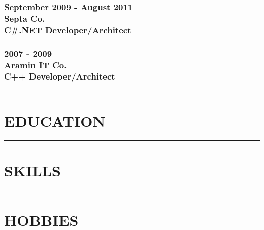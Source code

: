 \documentclass[10pt,a4paper]{article}
\begin{document}
\subsubsection{\textnormal {September 2009 - August 2011} \\ \textnormal {Septa Co.} \\ C\#.NET Developer/Architect}
  \setlength{\leftskip}{0.5cm}
  \setlength{\rightskip}{1cm}
  \lipsum[2]
  \setlength{\leftskip}{0pt}
  \setlength{\rightskip}{0cm}
  
\subsubsection{\textnormal {2007 - 2009} \\ \textnormal {Aramin IT Co.} \\ C++ Developer/Architect}
  \setlength{\leftskip}{0.5cm}
  \setlength{\rightskip}{1cm}
  \lipsum[2]
  \setlength{\leftskip}{0pt}
  \setlength{\rightskip}{0cm}

\rule {15cm}{0.4pt}

\section{EDUCATION}

\rule {15cm}{0.4pt}

\section{SKILLS}

\rule {15cm}{0.4pt}

\section{HOBBIES}
\end{document}
